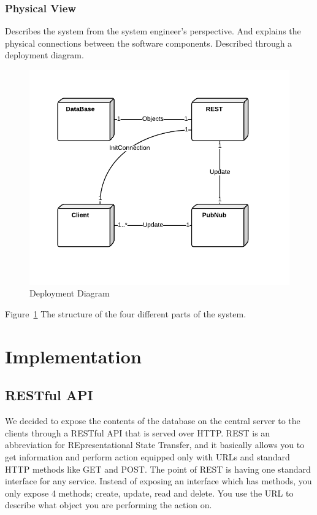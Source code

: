 


\subsubsection{Physical View}
Describes the system from the system engineer's perspective. And explains the physical connections between the software components. Described through a deployment diagram. 

\begin{figure}
\centering
\includegraphics[width=6in]{image/DeploymentDiagram.png}
\caption{Deployment Diagram}
\label{figure:deploymentDiagram}
\end{figure}

Figure~\ref{figure:deploymentDiagram} The structure of the four different parts of the system.


\section{Implementation}

\subsection{RESTful API}
We decided to expose the contents of the database on the central server to the clients through a RESTful API that is served over HTTP. REST is an abbreviation for REpresentational State Transfer, and it basically allows you to get information and perform action equipped only with URLs and standard HTTP methods like GET and POST. The point of REST is having one standard interface for any service. Instead of exposing an interface which has methods, you only expose 4 methods; create, update, read and delete.  You use the URL to describe what object you are performing the action on.

